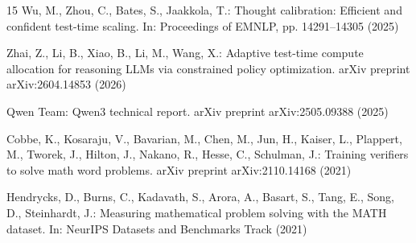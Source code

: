 \documentclass[runningheads]{llncs}
\begin{document}
\begin{thebibliography}{15}
Wu, M., Zhou, C., Bates, S., Jaakkola, T.: Thought calibration: Efficient and
confident test-time scaling. In: Proceedings of EMNLP, pp. 14291--14305
(2025)

Zhai, Z., Li, B., Xiao, B., Li, M., Wang, X.: Adaptive test-time compute
allocation for reasoning LLMs via constrained policy optimization. arXiv
preprint arXiv:2604.14853 (2026)

Qwen Team: Qwen3 technical report. arXiv preprint arXiv:2505.09388 (2025)

Cobbe, K., Kosaraju, V., Bavarian, M., Chen, M., Jun, H., Kaiser, L.,
Plappert, M., Tworek, J., Hilton, J., Nakano, R., Hesse, C., Schulman, J.:
Training verifiers to solve math word problems. arXiv preprint
arXiv:2110.14168 (2021)

Hendrycks, D., Burns, C., Kadavath, S., Arora, A., Basart, S., Tang, E.,
Song, D., Steinhardt, J.: Measuring mathematical problem solving with the
MATH dataset. In: NeurIPS Datasets and Benchmarks Track (2021)

\end{thebibliography}
\end{document}

